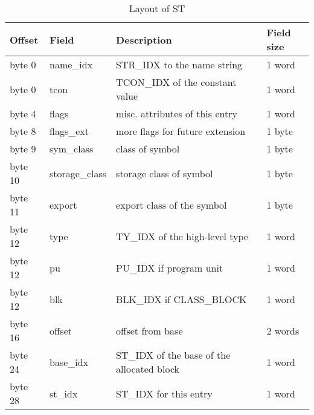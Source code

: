 \begin{table}[h]
\centering
\caption{Layout of ST} 
\begin{tabular}{|l|l|l|l|}\hline
Offset & Field & Description & Field size\\\hline \hline
byte 0 & name\_idx &
\index{STR\_IDX}%
STR\_IDX to the name string & 1 word\\
byte 0 & tcon &
\index{TCON\_IDX}%
TCON\_IDX of the constant value & 1 word\\\hline
byte 4 & flags & misc. attributes of this entry & 1 word \\\hline
byte 8 & flags\_ext & more flags for future extension & 1 byte \\\hline
byte 9 & sym\_class & class of symbol & 1 byte \\\hline 
byte 10 & storage\_class & storage class of symbol & 1 byte \\\hline
byte 11 & export & export class of the symbol & 1 byte \\\hline
byte 12 & type &
\index{TY\_IDX}%
TY\_IDX of the high-level type & 1 word \\\hline
byte 12 & pu &
\index{PU\_IDX}%
PU\_IDX if program unit & 1 word \\\hline
byte 12 & blk &
\index{BLK\_IDX}%
BLK\_IDX if
\index{CLASS\_BLOCK}%
CLASS\_BLOCK & 1 word \\\hline
byte 16 & offset & offset from base & 2 words \\\hline
byte 24 & base\_idx &
\index{ST\_IDX}%
ST\_IDX of the base of the allocated block & 1
word \\\hline
byte 28 & st\_idx &
\index{ST\_IDX}%
ST\_IDX for this entry & 1 word\\\hline
\end{tabular}
\end{table}


